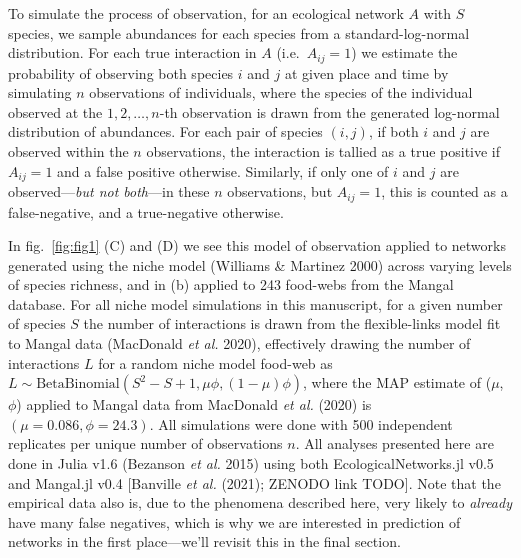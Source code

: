 \documentclass[10pt,oneside]{article}
\begin{document}
To simulate the process of observation, for an ecological network \(A\)
with \(S\) species, we sample abundances for each species from a
standard-log-normal distribution. For each true interaction in \(A\)
(i.e.~\(A_{ij} = 1\)) we estimate the probability of observing both
species \(i\) and \(j\) at given place and time by simulating \(n\)
observations of individuals, where the species of the individual
observed at the \(1,2,\dots,n\)-th observation is drawn from the
generated log-normal distribution of abundances. For each pair of
species \((i,j)\), if both \(i\) and \(j\) are observed within the \(n\)
observations, the interaction is tallied as a true positive if
\(A_{ij}=1\) and a false positive otherwise. Similarly, if only one of
\(i\) and \(j\) are observed---\emph{but not both}---in these \(n\)
observations, but \(A_{ij}=1\), this is counted as a false-negative, and
a true-negative otherwise.

In fig.~\ref{fig:fig1} (C) and (D) we see this model of observation
applied to networks generated using the niche model (Williams \&
Martinez 2000) across varying levels of species richness, and in (b)
applied to 243 food-webs from the Mangal database. For all niche model
simulations in this manuscript, for a given number of species \(S\) the
number of interactions is drawn from the flexible-links model fit to
Mangal data (MacDonald \emph{et al.} 2020), effectively drawing the
number of interactions \(L\) for a random niche model food-web as
\(L \sim \text{BetaBinomial}(S^2-S+1, \mu \phi, (1-\mu)\phi)\), where
the MAP estimate of (\(\mu\), \(\phi\)) applied to Mangal data from
MacDonald \emph{et al.} (2020) is \((\mu = 0.086, \phi =24.3)\). All
simulations were done with 500 independent replicates per unique number
of observations \(n\). All analyses presented here are done in Julia
v1.6 (Bezanson \emph{et al.} 2015) using both EcologicalNetworks.jl v0.5
and Mangal.jl v0.4 {[}Banville \emph{et al.} (2021); ZENODO link
TODO{]}. Note that the empirical data also is, due to the phenomena
described here, very likely to \emph{already} have many false negatives,
which is why we are interested in prediction of networks in the first
place---we'll revisit this in the final section.
\end{document}
